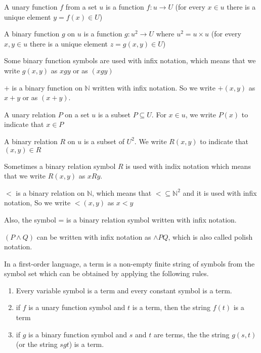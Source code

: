 \begin{defn}
A unary function $f$ from a set $u$ is a function $f\colon u\to U$ (for every $x\in u$ there is a unique element $y=f(x)\in U$)

A binary function $g$ on $u$ is a function $g\colon u^2\to U$ where $u^2 = u\times u$ (for every $x,y\in u$ there is a unique element $z=g(x,y)\in U$)
\end{defn}

Some binary function symbols are used with infix notation, which means that we write $g(x,y)$ as $xgy$ or as $(xgy)$ 

\begin{exmp}

$+$ is a binary function on $\mathbb{N}$ written with infix notation. So we write $+(x,y)$ as $x+y$ or as $(x+y)$.
\end{exmp}


\begin{defn}
A unary relation $P$ on a set $u$ is a subset $P\subseteq U$. For $x\in u$, we write $P(x)$ to indicate that $x\in P$

A binary relation $R$ on $u$ is a subset of $U^2$. We write $R(x,y)$ to indicate that $(x,y)\in R$
\end{defn}
Sometimes a binary relation symbol $R$ is used with indix notation which means that we write $R(x,y)$ as $xRy$.


\begin{exmp}

$<$ is a binary relation on $\mathbb{N}$, which means that $<\subseteq \mathbb{N}^2$ and it is used with infix notation, So we write $<(x,y)$ as $x<y$

Also, the symbol = is a binary relation symbol written with infix notation.

\end{exmp}

\begin{rem}
$(P\wedge Q)$ can be written with infix notation as $\wedge PQ$, which is also called polish notation.
\end{rem}

\begin{defn}
In a first-order language, a term is a non-empty finite string of symbols from the symbol set which can be obtained by applying the following rules.
\begin{enumerate}
\item Every variable symbol is a term and every constant symbol is a term.
\item if $f$ is a unary function symbol and $t$ is a term, then the string $f(t)$ is a term
\item if $g$ is a binary function symbol and $s$ and $t$ are terms, the the string $g(s,t)$ (or the string $sgt$) is a term.
\end{enumerate}
\end{defn}

